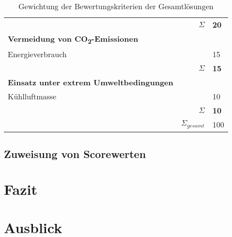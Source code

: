 \begin{table}
\begin{tabularx}{\linewidth}{Xrl}
		                                                         &          $\Sigma$ & \textbf{20}     \\
		\textbf{Vermeidung von CO\textsubscript{2}-Emissionen}   &                   &  \\
		Energieverbrauch                                         &                   & 15              \\ \midrule
		                                                         &          $\Sigma$ & \textbf{15}     \\
		\textbf{Einsatz unter extrem Umweltbedingungen}          &                   &  \\
		Kühlluftmasse                                            &                   & 10              \\ \midrule
		                                                         &          $\Sigma$ & \textbf{10}     \\ \midrule
		                                                         & $\Sigma_{gesamt}$ & 100 \\ \bottomrule
	\end{tabularx}
	\caption{Gewichtung der Bewertungskriterien der Gesamtlösungen}
	\label{tab_bewertungskriterien}
\end{table} 

\subsection{Zuweisung von Scorewerten}





\section{Fazit}
\section{Ausblick}